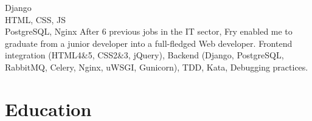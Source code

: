 \documentclass[a4paper,11pt]{cv4tw}%
\begin{document}
{Django\\HTML, CSS, JS\\PostgreSQL, Nginx}
	{ After 6 previous jobs in the IT sector, Fry enabled me to graduate from a junior developer into a full-fledged Web developer.
        Frontend integration (HTML4\&5, CSS2\&3, jQuery), 
        Backend (Django, PostgreSQL, RabbitMQ, Celery, Nginx, uWSGI, Gunicorn),
        TDD, Kata, Debugging practices.
}
\section{Education}

\end{document}
